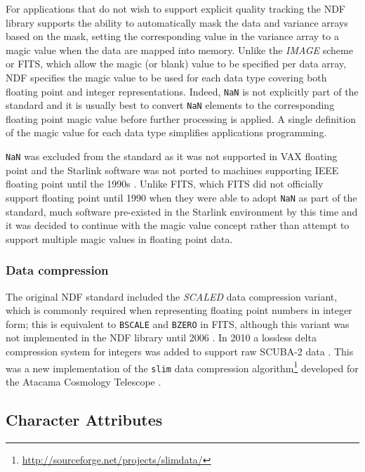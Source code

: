 \documentclass[final,authoryear,5p,times,twocolumn]{elsarticle}
\begin{document}
For applications that do not wish to support explicit quality tracking
the NDF library supports the ability to automatically mask the data
and variance arrays based on the mask, setting the corresponding value
in the variance array to a magic value when the data are mapped into
memory. Unlike the \emph{IMAGE} scheme
or FITS, which allow the magic (or blank) value to be specified per
data array, NDF specifies the magic value to be used for each data type
covering both floating point and integer representations. Indeed,
\texttt{NaN} is not explicitly part of the standard and it is usually
best to convert \texttt{NaN} elements to the corresponding floating point magic
value before further processing is applied. A single definition of the
magic value for each data type simplifies applications programming.

\texttt{NaN} was excluded from the standard as it was not
supported in VAX floating point \citep[see e.g.][]{660194} and the Starlink
software was not ported to machines supporting IEEE floating point
until the 1990s \citep[e.g.,][]{1991STARB...8...11C}. Unlike FITS, which
FITS did not officially support floating point until 1990
\citep{1989FPFITS,1991BAAS...23..993S} when they were able to adopt
\texttt{NaN} as part of the standard, much software pre-existed in the
Starlink environment by this time and it was decided to continue with
the magic value concept rather than attempt to support multiple magic
values in floating point data.

\subsubsection{Data compression}

The original NDF standard included the \emph{SCALED} data compression
variant, which is commonly required when representing floating point numbers in
integer form; this is equivalent to \texttt{BSCALE} and \texttt{BZERO} in
FITS, although this variant was not implemented in the NDF library
until 2006 \citep{2008ASPC..394..650C}. In 2010 a lossless delta
compression system for integers was added to support raw SCUBA-2 data
\citep{2013MNRAS.430.2513H}. This was a new implementation of the
\texttt{slim} data compression
algorithm\footnote{\url{http://sourceforge.net/projects/slimdata/}}
developed for the Atacama Cosmology Telescope
\citep{2004SPIE.5498....1F}.

\subsection{Character Attributes}
\end{document}
